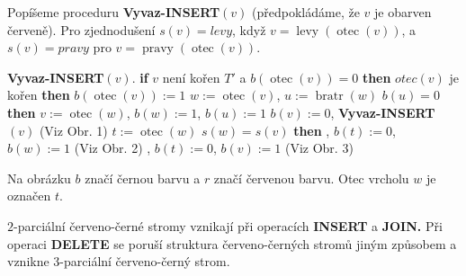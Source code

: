 \documentclass[a4paper,12pt]{article}
\DeclareMathOperator*{\otec}{otec}
\DeclareMathOperator*{\levy}{levy}
\DeclareMathOperator*{\pravy}{pravy}
\DeclareMathOperator*{\bratr}{bratr}
\begin{document}
Popíšeme proceduru {\bf Vyvaz-INSERT$(v)$} (předpokládáme, že 
$v$ je obarven červeně). Pro zjednodušení $s(v
)=levy$, když $v=\levy(\otec(v))$, a $s(v)=pravy$ pro  
$v=\pravy(\otec(v))$.

{\bf Vyvaz-INSERT$(v)$}.\newline 
{\bf if} $v$ není kořen $T'$ a $b(\otec(v))=0$ {\bf then}\newline 
\phantom{---}{\bf if} $otec(v)$ je kořen {\bf then}\newline 
\phantom{------}$b(\otec(v)):=1$\newline 
\phantom{---}{\bf else}\newline 
\phantom{------}$w:=\otec(v)$, $u:=\bratr(w)$\newline 
\phantom{------}{\bf if} $b(u)=0$ {\bf then}\newline 
\phantom{---------}$v:=\otec(w)$, $b(w):=1$, $b(u):=1$\newline 
\phantom{---------}$b(v):=0$, {\bf Vyvaz-INSERT$(v)$} (Viz Obr. 1)\newline 
\phantom{------}{\bf else}\newline 
\phantom{---------}$t:=\otec(w)$\newline 
\phantom{---------}{\bf if} $s(w)=s(v)$ {\bf then}\newline 
\phantom{------------}{\bf Rotace$(t,w)$}, $b(t):=0$, $b(w):=1$ (Viz Obr. 2)\newline 
\phantom{---------}{\bf else}\newline 
\phantom{------------}{\bf Dvojita-rotace$(t,w,v)$}, $b(t):=0$, $b(v):=1$ (Viz Obr. 3)\newline 
\phantom{---------}{\bf endif}\newline 
\phantom{------}{\bf endif}\newline 
\phantom{---}{\bf endif\newline 
endif}

Na obrázku $b$ značí černou barvu a $r$ značí červenou 
barvu. Otec vrcholu $w$ je označen $t$. 

\midinsert
\centerline{}
\endcaption
\endinsert

\midinsert
\centerline{}
\endcaption
\endinsert
\newpage

\midinsert
\centerline{}
\endcaption
\endinsert

$2$-parciální červeno-černé stromy vznikají při 
operacích {\bf INSERT} a {\bf JOIN.}  Při operaci {\bf DELETE} se poruší 
struktura červeno-černých stromů jiným 
způsobem a vznikne 3-parciální červeno-čer\-ný strom.  
\end{document}

